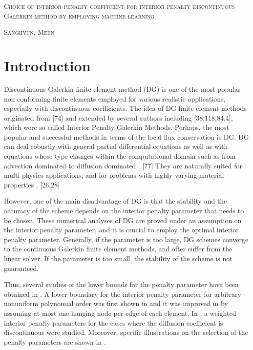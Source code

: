 \documentclass[11pt]{article}
\begin{document}
\begin{center}
{\Large{\textsc{
Choice of interior penalty coefficient for interior penalty discontinuous Galerkin method by employing machine learning}
}
}
\end{center}


\begin{center}
{{\textsc{
Sanghyun, Meen}
}
}
\end{center}

\section{Introduction}

Discontinuous Galerkin finite element method (DG) is one of the most popular non conforming finite elements  employed for various realistic applications, especially with discontinuous coefficients. The idea of DG finite element methods originated from  [74]  and extended by several authors including 
[38,118,84,4], which were so called Interior Penalty Galerkin Methods.  
Perhaps, the most popular and successful methods in terms of the local flux conservation is DG. 
DG can deal robustly with general partial differential equations as well as with equations whose 
type changes within the computational domain 
such as from advection dominated to diffusion dominated \cite{Sun2005, Sun2006}. [77] 
They are naturally suited for multi-physics applications, and for problems with highly varying material properties \cite{ref1,riviere2000discontinuous,CNM:CNM464}.  [26,28]

However, one of the main disadvantage of DG is that the stability and the accuracy of the scheme depends on the interior penalty  parameter that needs to be chosen. 
These numerical analyses of DG are proved under an assumption on the interior penalty parameter, and it is crucial to employ the optimal interior penalty parameter. 
Generally, if the parameter is too large, DG schemes converge to the continuous Galerkin finite element methods, and ofter suffer from the linear solver. If the parameter is too small, the stability of the scheme is not guaranteed. 


Thus, several studies of the lower bounds for the penalty parameter have been obtained in \cite{ainsworth2007posteriori,ainsworth2010fully,ainsworth2009constant,epshteyn2007estimation,shahbazi2005explicit}. 
A lower boundary for the interior penalty parameter for arbitrary nonuniform polynomial order was first shown in 
 \cite{shahbazi2005explicit} and it was improved in \cite{ainsworth2009constant} by assuming at most one hanging node per edge of each element. In \cite{ern2008posteriori,ern2009discontinuous}, a weighted interior penalty parameters for the cases where the diffusion coefficient is discontinuous were studied. 
Moreover, specific illustrations on the selection of the penalty parameters are shown in \cite{ainsworth2012note}.
\end{document}
